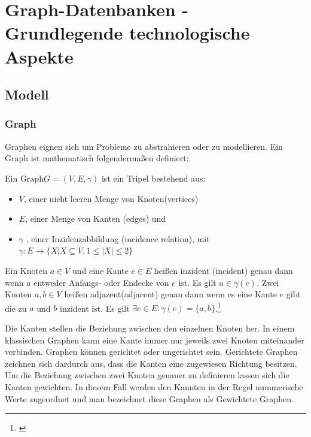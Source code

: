\chapter{Graph-Datenbanken - Grundlegende technologische Aspekte}
\section{Modell}
\subsection{Graph}
Graphen eignen sich um Probleme zu abstrahieren oder zu modellieren.
Ein Graph ist mathematisch folgendermaßen definiert:
\begin{definition}
	Ein $\text{Graph} G=(V,E,\gamma)$ ist ein Tripel bestehend aus:
	\begin{itemize}
		\item $V$, einer nicht leeren Menge von Knoten(vertices)
		\item $E$, einer Menge von Kanten (edges) und
		\item $\gamma$ , einer Inzidenzabbildung (incidence relation), mit\\
		$\gamma : E \longrightarrow \{X | X \subseteq V, 1 \leq |X| \leq 2\}$
	\end{itemize}

	Ein Knoten $a \in V$ und eine Kante $e \in E$ heißen inzident (incident)
	genau dann wenn $a$ entweder Anfangs- oder Endecke von $e$ ist. Es gilt $a \in \gamma(e)$.
	Zwei Knoten $a,b \in V$ heißen adjazent(adjacent) genau dann wenn es eine Kante $e$ gibt die zu $a$ und $b$ inzident ist.
	Es gilt	$\exists e \in E: \gamma(e)=\{a,b\}$.\footnote{\cite[Seite 21]{pbeck01}} \\

\end{definition}
Die Kanten stellen die Beziehung zwischen den einzelnen Knoten her.
In einem klassischen Graphen kann eine Kante immer nur jeweils zwei Knoten miteinander verbinden.
Graphen können gerichtet oder ungerichtet sein. Gerichtete Graphen zeichnen sich dardurch aus, dass die Kanten eine zugewiesen Richtung besitzen.
Um die Beziehung zwischen zwei Knoten genauer zu definieren lassen sich die Kanten gewichten.
In diesem Fall werden den Kannten in der Regel nummerische Werte zugeordnet und man bezeichnet diese Graphen als Gewichtete Graphen.

